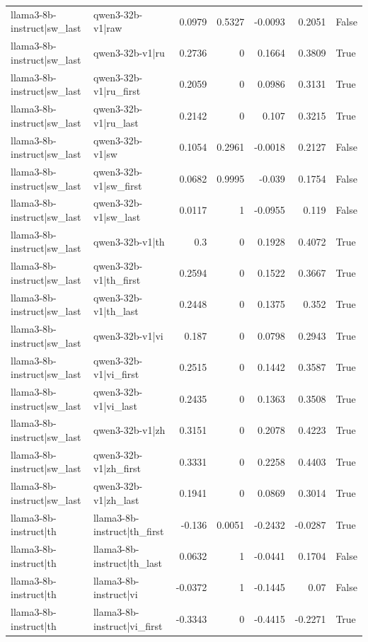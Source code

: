 \begin{table}
\begin{tabular}{l l r r r r l}
llama3-8b-instruct|sw_last & qwen3-32b-v1|raw & 0.0979 & 0.5327 & -0.0093 & 0.2051 & False \\
llama3-8b-instruct|sw_last & qwen3-32b-v1|ru & 0.2736 & 0 & 0.1664 & 0.3809 & True \\
llama3-8b-instruct|sw_last & qwen3-32b-v1|ru_first & 0.2059 & 0 & 0.0986 & 0.3131 & True \\
llama3-8b-instruct|sw_last & qwen3-32b-v1|ru_last & 0.2142 & 0 & 0.107 & 0.3215 & True \\
llama3-8b-instruct|sw_last & qwen3-32b-v1|sw & 0.1054 & 0.2961 & -0.0018 & 0.2127 & False \\
llama3-8b-instruct|sw_last & qwen3-32b-v1|sw_first & 0.0682 & 0.9995 & -0.039 & 0.1754 & False \\
llama3-8b-instruct|sw_last & qwen3-32b-v1|sw_last & 0.0117 & 1 & -0.0955 & 0.119 & False \\
llama3-8b-instruct|sw_last & qwen3-32b-v1|th & 0.3 & 0 & 0.1928 & 0.4072 & True \\
llama3-8b-instruct|sw_last & qwen3-32b-v1|th_first & 0.2594 & 0 & 0.1522 & 0.3667 & True \\
llama3-8b-instruct|sw_last & qwen3-32b-v1|th_last & 0.2448 & 0 & 0.1375 & 0.352 & True \\
llama3-8b-instruct|sw_last & qwen3-32b-v1|vi & 0.187 & 0 & 0.0798 & 0.2943 & True \\
llama3-8b-instruct|sw_last & qwen3-32b-v1|vi_first & 0.2515 & 0 & 0.1442 & 0.3587 & True \\
llama3-8b-instruct|sw_last & qwen3-32b-v1|vi_last & 0.2435 & 0 & 0.1363 & 0.3508 & True \\
llama3-8b-instruct|sw_last & qwen3-32b-v1|zh & 0.3151 & 0 & 0.2078 & 0.4223 & True \\
llama3-8b-instruct|sw_last & qwen3-32b-v1|zh_first & 0.3331 & 0 & 0.2258 & 0.4403 & True \\
llama3-8b-instruct|sw_last & qwen3-32b-v1|zh_last & 0.1941 & 0 & 0.0869 & 0.3014 & True \\
llama3-8b-instruct|th & llama3-8b-instruct|th_first & -0.136 & 0.0051 & -0.2432 & -0.0287 & True \\
llama3-8b-instruct|th & llama3-8b-instruct|th_last & 0.0632 & 1 & -0.0441 & 0.1704 & False \\
llama3-8b-instruct|th & llama3-8b-instruct|vi & -0.0372 & 1 & -0.1445 & 0.07 & False \\
llama3-8b-instruct|th & llama3-8b-instruct|vi_first & -0.3343 & 0 & -0.4415 & -0.2271 & True \\

\end{tabular}
\end{table}
